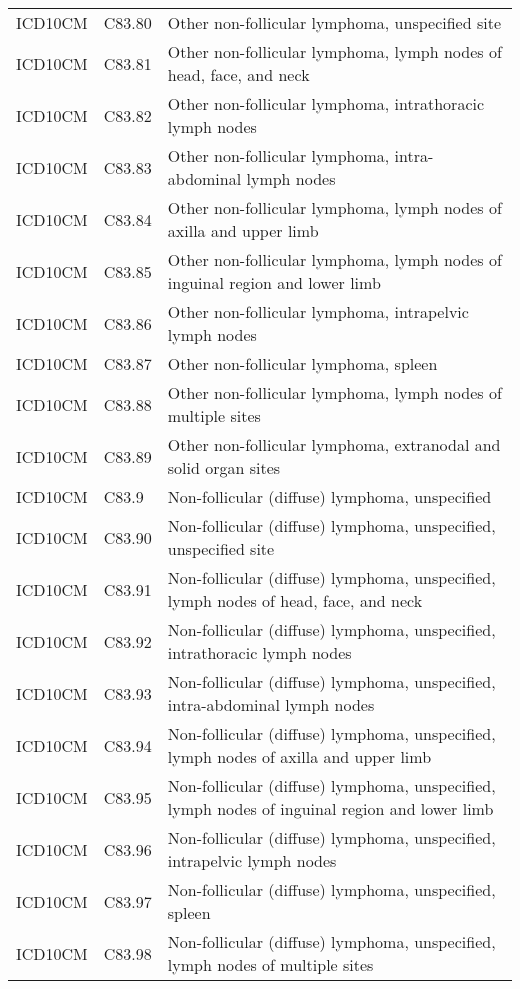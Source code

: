 \begin{table}[ht]
\begin{tabular}{lll}
  ICD10CM & C83.80 & Other non-follicular lymphoma, unspecified site \\ 
  ICD10CM & C83.81 & Other non-follicular lymphoma, lymph nodes of head, face, and neck \\ 
  ICD10CM & C83.82 & Other non-follicular lymphoma, intrathoracic lymph nodes \\ 
  ICD10CM & C83.83 & Other non-follicular lymphoma, intra-abdominal lymph nodes \\ 
  ICD10CM & C83.84 & Other non-follicular lymphoma, lymph nodes of axilla and upper limb \\ 
  ICD10CM & C83.85 & Other non-follicular lymphoma, lymph nodes of inguinal region and lower limb \\ 
  ICD10CM & C83.86 & Other non-follicular lymphoma, intrapelvic lymph nodes \\ 
  ICD10CM & C83.87 & Other non-follicular lymphoma, spleen \\ 
  ICD10CM & C83.88 & Other non-follicular lymphoma, lymph nodes of multiple sites \\ 
  ICD10CM & C83.89 & Other non-follicular lymphoma, extranodal and solid organ sites \\ 
  ICD10CM & C83.9 & Non-follicular (diffuse) lymphoma, unspecified \\ 
  ICD10CM & C83.90 & Non-follicular (diffuse) lymphoma, unspecified, unspecified site \\ 
  ICD10CM & C83.91 & Non-follicular (diffuse) lymphoma, unspecified, lymph nodes of head, face, and neck \\ 
  ICD10CM & C83.92 & Non-follicular (diffuse) lymphoma, unspecified, intrathoracic lymph nodes \\ 
  ICD10CM & C83.93 & Non-follicular (diffuse) lymphoma, unspecified, intra-abdominal lymph nodes \\ 
  ICD10CM & C83.94 & Non-follicular (diffuse) lymphoma, unspecified, lymph nodes of axilla and upper limb \\ 
  ICD10CM & C83.95 & Non-follicular (diffuse) lymphoma, unspecified, lymph nodes of inguinal region and lower limb \\ 
  ICD10CM & C83.96 & Non-follicular (diffuse) lymphoma, unspecified, intrapelvic lymph nodes \\ 
  ICD10CM & C83.97 & Non-follicular (diffuse) lymphoma, unspecified, spleen \\ 
  ICD10CM & C83.98 & Non-follicular (diffuse) lymphoma, unspecified, lymph nodes of multiple sites \\ 

\end{tabular}
\end{table}
